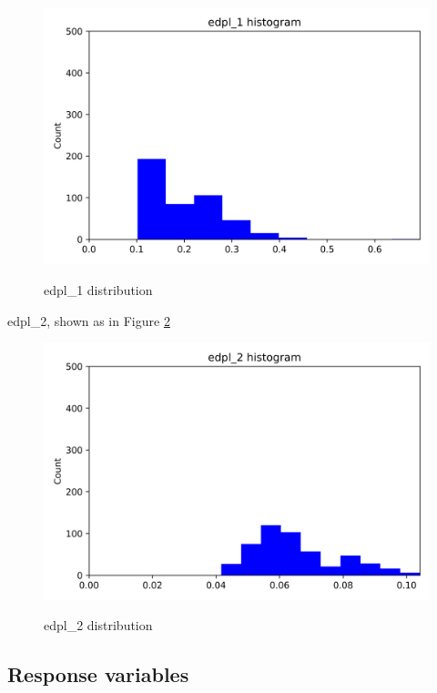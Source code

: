 \documentclass{article}
\begin{document}
\begin{figure}[htbp]
	\centering
	\includegraphics[width=\textwidth, keepaspectratio]{edpl_1-communitylevel.png}\\
	\caption{edpl_1 distribution}
	\label{edpl_1-communitylevel}
\end{figure}
edpl_2, shown as in Figure \ref{edpl_2-communitylevel}
\begin{figure}[htbp]
	\centering
	\includegraphics[width=\textwidth, keepaspectratio]{edpl_2-communitylevel.png}\\
	\caption{edpl_2 distribution}
	\label{edpl_2-communitylevel}
\end{figure}
\subsection{Response variables}
\end{document}
